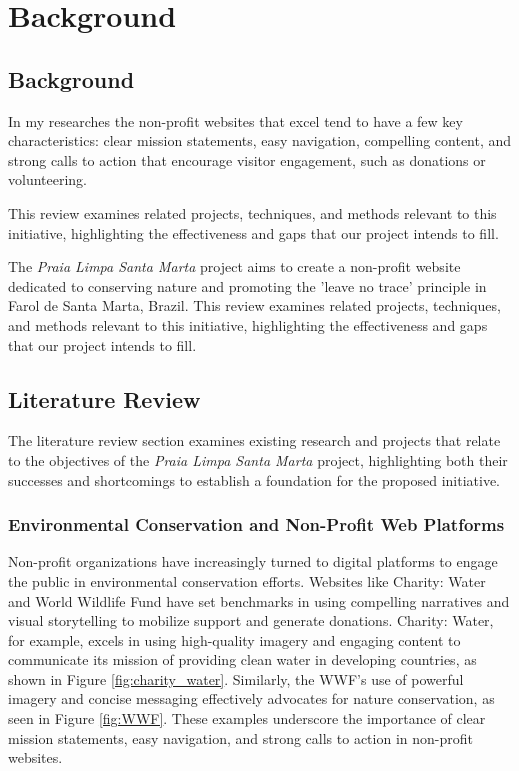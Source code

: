 \chapter{Background}
\label{ch:background}


\section{Background}

In my researches the non-profit websites that excel tend to have a few key characteristics: clear mission statements, easy navigation, compelling content, and strong calls to action that encourage visitor engagement, such as donations or volunteering.

This review examines related projects, techniques, and methods relevant to this initiative, highlighting the effectiveness and gaps that our project intends to fill.

The \textit{Praia Limpa Santa Marta} project aims to create a non-profit website dedicated to conserving nature and promoting the 'leave no trace' principle in Farol de Santa Marta, Brazil. This review examines related projects, techniques, and methods relevant to this initiative, highlighting the effectiveness and gaps that our project intends to fill.

\section{Literature Review}

The literature review section examines existing research and projects that relate to the objectives of the \textit{Praia Limpa Santa Marta} project, highlighting both their successes and shortcomings to establish a foundation for the proposed initiative.

\subsection{Environmental Conservation and Non-Profit Web Platforms}
Non-profit organizations have increasingly turned to digital platforms to engage the public in environmental conservation efforts. Websites like Charity: Water\cite{charitywater} and World Wildlife Fund\cite{wwf} have set benchmarks in using compelling narratives and visual storytelling to mobilize support and generate donations. Charity: Water, for example, excels in using high-quality imagery and engaging content to communicate its mission of providing clean water in developing countries, as shown in Figure \ref{fig:charity_water}. Similarly, the WWF’s use of powerful imagery and concise messaging effectively advocates for nature conservation, as seen in Figure \ref{fig:WWF}. These examples underscore the importance of clear mission statements, easy navigation, and strong calls to action in non-profit websites.

